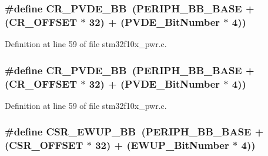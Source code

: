 \subsubsection[{\texorpdfstring{C\+R\+\_\+\+P\+V\+D\+E\+\_\+\+BB}{CR_PVDE_BB}}]{\setlength{\rightskip}{0pt plus 5cm}\#define C\+R\+\_\+\+P\+V\+D\+E\+\_\+\+BB~({\bf P\+E\+R\+I\+P\+H\+\_\+\+B\+B\+\_\+\+B\+A\+SE} + ({\bf C\+R\+\_\+\+O\+F\+F\+S\+ET} $\ast$ 32) + ({\bf P\+V\+D\+E\+\_\+\+Bit\+Number} $\ast$ 4))}\hypertarget{group___p_w_r___private___defines_ga49f51ef8285a6be76fd204d49a00709c}{}\label{group___p_w_r___private___defines_ga49f51ef8285a6be76fd204d49a00709c}


Definition at line 59 of file stm32f10x\+\_\+pwr.\+c.

\subsubsection[{\texorpdfstring{C\+R\+\_\+\+P\+V\+D\+E\+\_\+\+BB}{CR_PVDE_BB}}]{\setlength{\rightskip}{0pt plus 5cm}\#define C\+R\+\_\+\+P\+V\+D\+E\+\_\+\+BB~({\bf P\+E\+R\+I\+P\+H\+\_\+\+B\+B\+\_\+\+B\+A\+SE} + ({\bf C\+R\+\_\+\+O\+F\+F\+S\+ET} $\ast$ 32) + ({\bf P\+V\+D\+E\+\_\+\+Bit\+Number} $\ast$ 4))}\hypertarget{group___p_w_r___private___defines_ga49f51ef8285a6be76fd204d49a00709c}{}\label{group___p_w_r___private___defines_ga49f51ef8285a6be76fd204d49a00709c}


Definition at line 59 of file stm32f10x\+\_\+pwr.\+c.

\subsubsection[{\texorpdfstring{C\+S\+R\+\_\+\+E\+W\+U\+P\+\_\+\+BB}{CSR_EWUP_BB}}]{\setlength{\rightskip}{0pt plus 5cm}\#define C\+S\+R\+\_\+\+E\+W\+U\+P\+\_\+\+BB~({\bf P\+E\+R\+I\+P\+H\+\_\+\+B\+B\+\_\+\+B\+A\+SE} + ({\bf C\+S\+R\+\_\+\+O\+F\+F\+S\+ET} $\ast$ 32) + ({\bf E\+W\+U\+P\+\_\+\+Bit\+Number} $\ast$ 4))}\hypertarget{group___p_w_r___private___defines_gaaff864595f697850b19173b0bca991b0}{}\label{group___p_w_r___private___defines_gaaff864595f697850b19173b0bca991b0}


